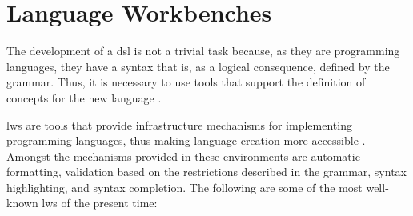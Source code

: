 \section{Language Workbenches}
\label{sec_back:LangWorkbench}

The development of a \ac{dsl} is not a trivial task because, as they are programming languages, they have a syntax that is, as a logical consequence, defined by the grammar.
Thus, it is necessary to use tools that support the definition of concepts for the new language \cite{Fowler:2005}.

\acp{lw} are tools that provide infrastructure mechanisms for implementing programming languages, thus making language creation more accessible \cite{Wachsmuth:2014}.
Amongst the mechanisms provided in these environments are automatic formatting, validation based on the restrictions described in the grammar, syntax highlighting, and syntax completion.
The following are some of the most well-known \acp{lw} of the present time:

    
